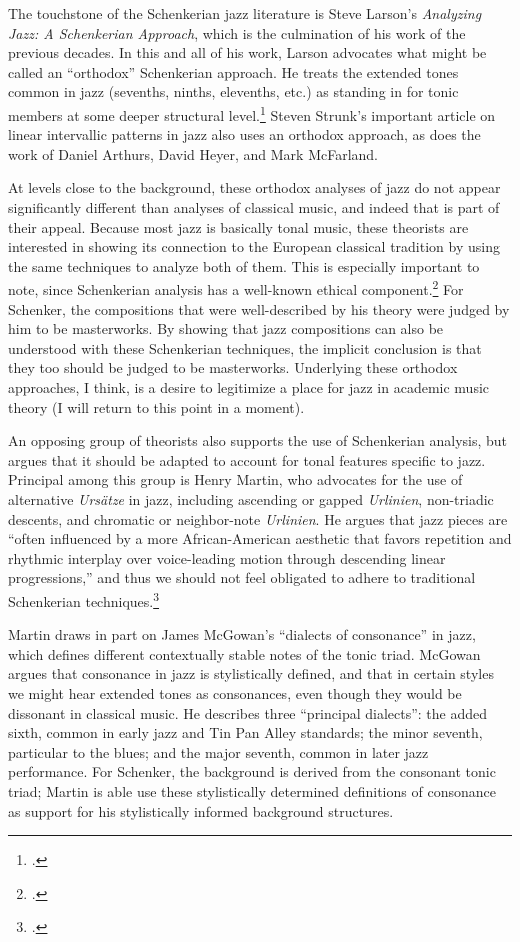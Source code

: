 \documentclass[diss]{subfiles}
\begin{document}
The touchstone of the Schenkerian jazz literature is Steve Larson’s
\emph{Analyzing Jazz: A Schenkerian Approach}, which is the culmination of his
work of the previous decades. In this and all of his work, Larson
advocates what might be called an “orthodox” Schenkerian approach. He treats
the extended tones common in jazz (sevenths, ninths, elevenths, etc.) as
standing in for tonic members at some deeper structural
level.\footcite[6]{larson:2009} Steven Strunk’s important article on linear
intervallic patterns in jazz also uses an orthodox approach, as does the work
of Daniel Arthurs, David Heyer, and Mark McFarland.

At levels close to the background, these orthodox analyses of jazz do not
appear significantly different than analyses of classical music, and indeed
that is part of their appeal. Because most jazz is basically tonal
music, these theorists are interested in showing its connection to the
European classical tradition by using the same techniques to analyze both of
them. This is especially important to note, since Schenkerian analysis has a
well-known ethical component.\footcite{cook:1989} For Schenker, the
compositions that were well-described by his theory were judged by him to be
masterworks. By showing that jazz compositions can also be understood with
these Schenkerian techniques, the implicit conclusion is that they too should
be judged to be masterworks. Underlying these orthodox approaches, I think, is
a desire to legitimize a place for jazz in academic music theory (I will
return to this point in a moment).

An opposing group of theorists also supports the use of Schenkerian analysis,
but argues that it should be adapted to account for tonal features specific to
jazz. Principal among this group is Henry Martin, who advocates for the use of
alternative \emph{Ursätze} in jazz, including ascending or gapped
\emph{Urlinien}, non-triadic descents, and chromatic or neighbor-note
\emph{Urlinien}. He argues that jazz pieces are “often influenced by
a more African-American aesthetic that favors repetition and rhythmic
interplay over voice-leading motion through descending linear progressions,”
and thus we should not feel obligated to adhere to traditional Schenkerian
techniques.\footcite[7]{martin:2011}

Martin draws in part on James McGowan’s “dialects of consonance” in jazz,
which defines different contextually stable notes of the tonic triad.
McGowan argues that consonance in jazz is stylistically defined, and that in
certain styles we might hear extended tones as consonances, even though they
would be dissonant in classical music. He describes three “principal dialects”:
the added sixth, common in early jazz and Tin Pan Alley standards; the minor
seventh, particular to the blues; and the major seventh, common in later jazz
performance. For Schenker, the background is derived from the
consonant tonic triad; Martin is able use these stylistically determined
definitions of consonance as support for his stylistically informed background
structures.
\end{document}
